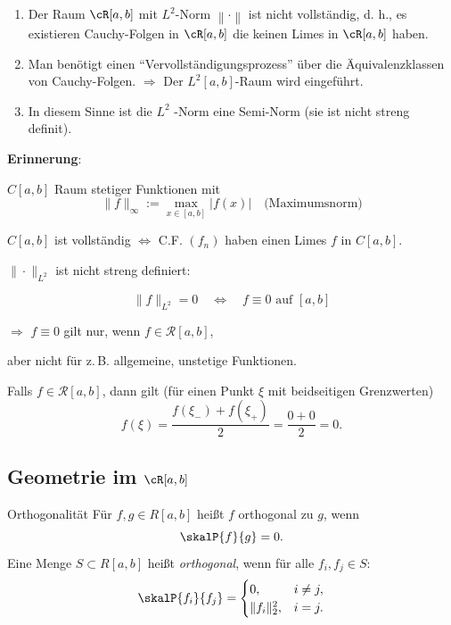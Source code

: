 \begin{bemerkungbox}
    \begin{enumerate}
        \item Der Raum $\cR[a, b]$ mit $L^2$-Norm $\left\|\cdot\right\|$ ist nicht vollständig, d. h., es existieren Cauchy-Folgen in $\cR[a, b]$ die keinen Limes in $\cR[a, b]$ haben.
        \item Man benötigt einen “Vervollständigungsprozess” über die Äquivalenzklassen von Cauchy-Folgen.
        $\Rightarrow$ Der $L^2 [a,b]$-Raum wird eingeführt.
        \item In diesem Sinne ist die $L^2$ -Norm eine Semi-Norm (sie ist nicht streng definit).
    \end{enumerate}
    \vspace{1em}

    \textbf{Erinnerung}:

    $C[a,b]$ Raum stetiger Funktionen mit
    $$
    \|f\|_{\infty} := \max_{x\in[a,b]} |f(x)| \quad\text{(Maximumsnorm)}
    $$

    $C[a,b]$ ist vollständig $\iff$ C.F. $(f_n)$ haben einen Limes $f$ in $C[a,b]$.

    \bigskip

    $\|\cdot\|_{L^2}$ ist nicht streng definiert:

    $$
    \|f\|_{L^2}=0 \quad\Longleftrightarrow\quad f\equiv 0 \text{ auf } [a,b]
    $$

    $\Longrightarrow$ $f\equiv 0$ gilt nur, wenn $f\in \mathcal{R}[a,b]$,

    aber nicht für z.\,B. allgemeine, unstetige Funktionen.



    Falls $f\in \mathcal{R}[a,b]$, dann gilt (für einen Punkt $\xi$ mit beidseitigen Grenzwerten)
    $$
    f(\xi)=\frac{f(\xi_-)+f(\xi_+)}{2}=\frac{0+0}{2}=0.
    $$
\end{bemerkungbox}

\subsection*{Geometrie im $\cR [a,b]$}
\begin{definition}{Orthogonalität}
    Für $f,g \in R[a,b]$ heißt $f$ orthogonal zu $g$, wenn
    $$
        \skalP{f}{g} = 0.
    $$
    Eine Menge $S \subset R[a,b]$ heißt \emph{orthogonal}, wenn für alle
    $f_i,f_j \in S$:
    $$
        \skalP{f_i}{f_j} =
        \begin{cases}
            0, & i \ne j,\\
            \|f_i\|_2^2, & i = j.
        \end{cases}
    $$
\end{definition}


